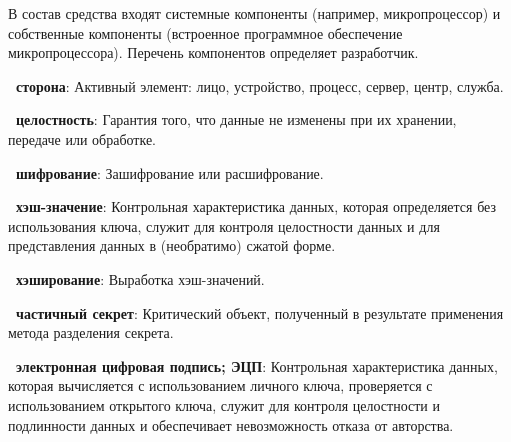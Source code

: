 \begin{note}
В состав средства входят системные компоненты (например, микропроцессор) и
собственные компоненты (встроенное программное обеспечение микропроцессора).
Перечень компонентов определяет разработчик.
\end{note}


{\bf \thedefctr~сторона}:
Активный элемент: лицо, устройство, процесс, сервер, центр, служба.


{\bf \thedefctr~целостность}:
Гарантия того, что данные не изменены при их хранении, передаче или обработке. 

{\bf \thedefctr~шифрование}:
Зашифрование или расшифрование.

{\bf \thedefctr~хэш-значение}:
Контрольная характеристика данных, которая определяется без использования ключа,
служит для контроля целостности данных и для представления данных в (необратимо)
сжатой форме.

{\bf \thedefctr~хэширование}:
Выработка хэш-значений.

{\bf \thedefctr~частичный секрет}:
Критический объект, 
полученный в результате применения метода разделения секрета.

{\bf \thedefctr~электронная цифровая подпись; ЭЦП}:
Контрольная характеристика данных, которая вычисляется с использованием личного
ключа, проверяется с использованием открытого ключа, служит для контроля
целостности и подлинности данных и обеспечивает невозможность отказа от
авторства.

